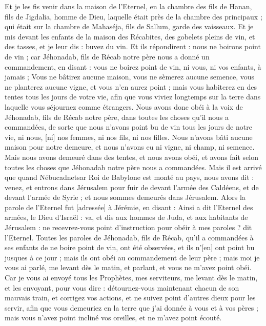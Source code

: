 \begin{multicols}{2}
Et je les fis venir dans la maison de l'Eternel, en la chambre des fils de Hanan, fils de Jigdalia, homme de Dieu, laquelle était près de la chambre des principaux ; qui était sur la chambre de Mahaséja, fils de Sallum, garde des vaisseaux.
Et je mis devant les enfants de la maison des Récabites, des gobelets pleins de vin, et des tasses, et je leur dis : buvez du vin.
Et ils répondirent : nous ne boirons point de vin ; car Jéhonadab, fils de Récab notre père nous a donné un commandement, en disant : vous ne boirez point de vin, ni vous, ni vos enfants, à jamais ;
Vous ne bâtirez aucune maison, vous ne sèmerez aucune semence, vous ne planterez aucune vigne, et vous n'en aurez point ; mais vous habiterez en des tentes tous les jours de votre vie, afin que vous viviez longtemps sur la terre dans laquelle vous séjournez comme étrangers.
Nous avons donc obéi à la voix de Jéhonadab, fils de Récab notre père, dans toutes les choses qu'il nous a commandées, de sorte que nous n'avons point bu de vin tous les jours de notre vie, ni nous, [ni] nos femmes, ni nos fils, ni nos filles.
Nous n'avons bâti aucune maison pour notre demeure, et nous n'avons eu ni vigne, ni champ, ni semence.
Mais nous avons demeuré dans des tentes, et nous avons obéi, et avons fait selon toutes les choses que Jéhonadab notre père nous a commandées.
Mais il est arrivé que quand Nébucadnetsar Roi de Babylone est monté au pays, nous avons dit : venez, et entrons dans Jérusalem pour fuir de devant l'armée des Caldéens, et de devant l'armée de Syrie ; et nous sommes demeurés dans Jérusalem.
Alors la parole de l'Eternel fut [adressée] à Jérémie, en disant :
Ainsi a dit l'Eternel des armées, le Dieu d'Israël : va, et dis aux hommes de Juda, et aux habitants de Jérusalem : ne recevrez-vous point d'instruction pour obéir à mes paroles ? dit l'Eternel.
Toutes les paroles de Jéhonadab, fils de Récab, qu'il a commandées à ses enfants de ne boire point de vin, ont été observées, et ils n'[en] ont point bu jusques à ce jour ; mais ils ont obéi au commandement de leur père ; mais moi je vous ai parlé, me levant dès le matin, et parlant, et vous ne m'avez point obéi.
Car je vous ai envoyé tous les Prophètes, mes serviteurs, me levant dès le matin, et les envoyant, pour vous dire : détournez-vous maintenant chacun de son mauvais train, et corrigez vos actions, et ne suivez point d'autres dieux pour les servir, afin que vous demeuriez en la terre que j'ai donnée à vous et à vos pères ; mais vous n'avez point incliné vos oreilles, et ne m'avez point écouté.

\end{multicols}
